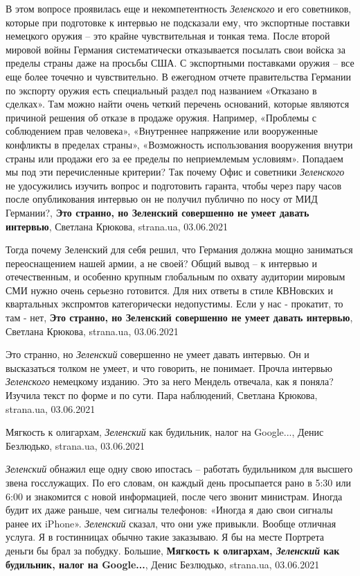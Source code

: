 В этом вопросе проявилась еще и некомпетентность \emph{Зеленского} и его советников,
которые при подготовке к интервью не подсказали ему, что экспортные поставки
немецкого оружия – это крайне чувствительная и тонкая тема. После второй
мировой войны Германия систематически отказывается посылать свои войска за
пределы страны даже на просьбы США. С экспортными поставками оружия – все еще
более точечно и чувствительно. В ежегодном отчете правительства Германии по
экспорту оружия есть специальный раздел под названием «Отказано в сделках». Там
можно найти очень четкий перечень оснований, которые являются причиной решения
об отказе в продаже оружия. Например, «Проблемы с соблюдением прав человека»,
«Внутреннее напряжение или вооруженные конфликты в пределах страны»,
«Возможность использования вооружения внутри страны или продажи его за ее
пределы по неприемлемым условиям». Попадаем мы под эти перечисленные критерии?
Так почему Офис и советники \emph{Зеленского} не удосужились изучить вопрос и
подготовить гаранта, чтобы через пару часов после опубликования интервью он не
получил публично по носу от МИД Германии?,
\textbf{Это странно, но Зеленский совершенно не умеет давать интервью}, Светлана Крюкова, 
strana.ua, 03.06.2021

Тогда почему Зеленский для себя решил, что Германия должна мощно заниматься
переоснащением нашей армии, а не своей? Общий вывод – к интервью и
отечественным, и особенно крупным глобальным по охвату аудитории мировым СМИ
нужно очень серьезно готовится. Для них ответы в стиле КВНовских и квартальных
экспромтов категорически недопустимы. Если у нас - прокатит, то там - нет,
\textbf{Это странно, но Зеленский совершенно не умеет давать интервью}, Светлана Крюкова, 
strana.ua, 03.06.2021

Это странно, но \emph{Зеленский} совершенно не умеет давать интервью. Он и
высказаться толком не умеет, и что говорить, не понимает. Прочла интервью
\emph{Зеленского} немецкому изданию. Это за него Мендель отвечала, как я поняла?
Изучила текст по форме и по сути. Пара наблюдений,
Светлана Крюкова, strana.ua, 03.06.2021

Мягкость к олигархам, \emph{Зеленский} как будильник, налог на Google..., Денис
Безлюдько, strana.ua, 03.06.2021

\emph{Зеленский} обнажил еще одну свою ипостась – работать будильником для высшего
звена госслужащих. По его словам, он каждый день просыпается рано в 5:30 или
6:00 и знакомится с новой информацией, после чего звонит министрам. Иногда
будит их даже раньше, чем сигналы телефонов: «Иногда я даю свои сигналы ранее
их iPhone». \emph{Зеленский} сказал, что они уже привыкли. Вообще отличная услуга. Я в
гостинницах обычно такие заказываю. Я бы на месте Портрета деньги бы брал за
побудку. Большие,
\textbf{Мягкость к олигархам, \emph{Зеленский} как будильник, налог на Google...}, Денис
Безлюдько, strana.ua, 03.06.2021

